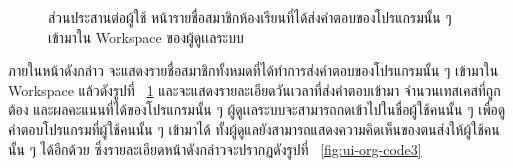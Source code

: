 \documentclass[12pt,oneside,openright,a4paper]{cpe-thai-project}
\begin{document}
    \begin{figure}[H]
    \centering
        \caption[ส่วนประสานต่อผู้ใช้ หน้ารายชื่อสมาชิกห้องเรียนที่ได้ส่งคำตอบของโปรแกรมเข้ามาใน Workspace ของผู้ดูเเลระบบ]{ส่วนประสานต่อผู้ใช้ หน้ารายชื่อสมาชิกห้องเรียนที่ได้ส่งคำตอบของโปรแกรมนั้น ๆ เข้ามาใน Workspace ของผู้ดูเเลระบบ}
        \label{fig:ui-org-assign6}
    \end{figure}
    \begin{flushleft}
    ภายในหน้าดังกล่าว จะแสดงรายชื่อสมาชิกทั้งหมดที่ได้ทำการส่งคำตอบของโปรแกรมนั้น ๆ เข้ามาใน Workspace แล้วดังรูปที่ ~\ref{fig:ui-org-assign6} และจะแสดงรายละเอียดวันเวลาที่ส่งคำตอบเข้ามา จำนวนเทสเคสที่ถูกต้อง และผลคะแนนที่ได้ของโปรแกรมนั้น ๆ ผู้ดูเเลระบบจะสามารถกดเข้าไปในชื่อผู้ใช้คนนั้น ๆ เพื่อดูคำตอบโปรแกรมที่ผู้ใช้คนนั้น ๆ เข้ามาได้ ทั้งผู้ดูแลยังสามารถแสดงความคิดเห็นของตนส่งให้ผู้ใช้คนนั้น ๆ ได้อีกด้วย ซึ่งรายละเอียดหน้าดังกล่าวจะปรากฏดังรูปที่ ~\ref{fig:ui-org-code3}
    \end{flushleft}
    \pagebreak
\end{document}
